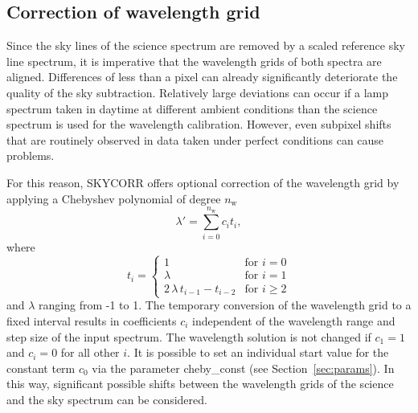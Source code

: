 \subsection{Correction of wavelength grid}\label{sec:wavegrid}

Since the sky lines of the science spectrum are removed by a scaled reference
sky line spectrum, it is imperative that the wavelength grids of both spectra
are aligned. Differences of less than a pixel can already significantly
deteriorate the quality of the sky subtraction. Relatively large deviations can
occur if a lamp spectrum taken in daytime at different ambient conditions than
the science spectrum is used for the wavelength calibration. However, even
subpixel shifts that are routinely observed in data taken under perfect
conditions can cause problems.

For this reason, SKYCORR offers optional correction of the wavelength grid by
applying a Chebyshev polynomial of degree
$n_\mathrm{w}$
\begin{equation}
\lambda' = \sum_{i = 0}^{n_\mathrm{w}} c_i t_i,
\end{equation}
where
\begin{equation}
t_i = \left\{ \begin{array}{ll}
1 & \textrm{for\ } i = 0 \\
\lambda & \textrm{for\ } i = 1 \\
2 \, \lambda \, t_{i-1} - t_{i-2} & \textrm{for\ } i \ge 2
\end{array} \right.
\end{equation}
and $\lambda$ ranging from -1 to 1. The temporary conversion of the wavelength
grid to a fixed interval results in coefficients $c_i$ independent of the
wavelength range and step size of the input spectrum. The wavelength solution
is not changed if $c_1 = 1$ and $c_i = 0$ for all other $i$. It is possible
to set an individual start value for the constant term $c_0$ via the parameter
{\sc cheby\_const} (see Section~\ref{sec:params}). In this way, significant
possible shifts between the wavelength grids of the science and the sky
spectrum can be considered.

